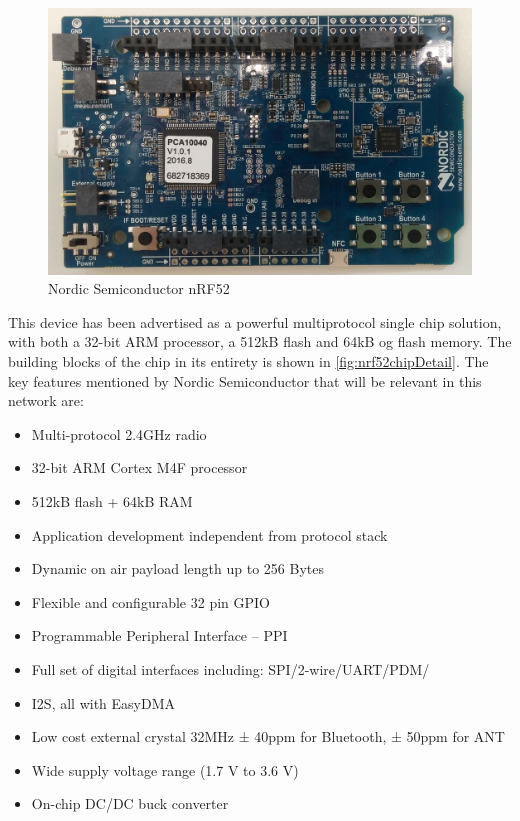 \begin{figure}[ht]
    \centering
    \includegraphics[width=1.0\textwidth]{nRF522.png}    
    \caption{Nordic Semiconductor nRF52 }
    \label{fig:nrf52picture}
\end{figure}


This device has been advertised as a powerful multiprotocol single chip solution, with both a 32-bit ARM processor, a 512kB flash and 64kB og flash memory. The building blocks of the chip in its entirety is shown in \ref{fig:nrf52chipDetail}. The key features mentioned by Nordic Semiconductor \cite{nrf52Nordic} that will be relevant in this network are: 

\begin{itemize}
	\item Multi-protocol 2.4GHz radio
	\item 32-bit ARM Cortex M4F processor
	\item 512kB flash + 64kB RAM
	\item Application development independent from protocol stack
	\item Dynamic on air payload length up to 256 Bytes
	\item Flexible and configurable 32 pin GPIO
	\item Programmable Peripheral Interface – PPI
	\item Full set of digital interfaces including: SPI/2-wire/UART/PDM/
	\item I2S, all with EasyDMA
	\item Low cost external crystal 32MHz ± 40ppm for Bluetooth, ± 50ppm for ANT
	\item Wide supply voltage range (1.7 V to 3.6 V)
	\item On-chip DC/DC buck converter
\end{itemize}


